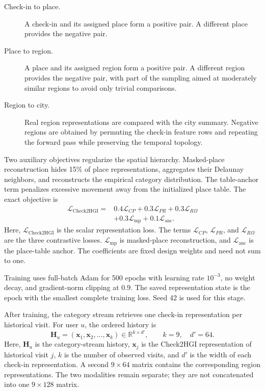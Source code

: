 \begin{description}
    \item[Check-in to place.] A check-in and its assigned place form a positive
    pair. A different place provides the negative pair.

    \item[Place to region.] A place and its assigned region form a positive pair.
    A different region provides the negative pair, with part of the sampling aimed
    at moderately similar regions to avoid only trivial comparisons.

    \item[Region to city.] Real region representations are compared with the city
    summary. Negative regions are obtained by permuting the check-in feature rows
    and repeating the forward pass while preserving the temporal topology.
\end{description}

Two auxiliary objectives regularize the spatial hierarchy. Masked-place
reconstruction hides 15\% of place representations, aggregates their Delaunay
neighbors, and reconstructs the empirical category distribution. The table-anchor
term penalizes excessive movement away from the initialized place table. The exact
objective is
\begin{equation}
\begin{split}
    \mathcal{L}_{\mathrm{Check2HGI}}={}&
    0.4\mathcal{L}_{C\!P}+0.3\mathcal{L}_{P\!R}
    +0.3\mathcal{L}_{R\!\Omega}\\
    &+0.3\mathcal{L}_{\mathrm{mp}}+0.1\mathcal{L}_{\mathrm{anc}}.
\end{split}
\label{eq:apx-check2hgi-loss}
\end{equation}
Here, $\mathcal{L}_{\mathrm{Check2HGI}}$ is the scalar representation loss.
The terms $\mathcal{L}_{C\!P}$, $\mathcal{L}_{P\!R}$, and
$\mathcal{L}_{R\!\Omega}$ are the three contrastive losses.
$\mathcal{L}_{\mathrm{mp}}$ is masked-place reconstruction, and
$\mathcal{L}_{\mathrm{anc}}$ is the place-table anchor. The coefficients are fixed
design weights and need not sum to one.

Training uses full-batch Adam for 500 epochs with learning rate $10^{-3}$, no weight
decay, and gradient-norm clipping at $0.9$. The saved representation state is the
epoch with the smallest complete training loss. Seed 42 is used for this stage.

After training, the category stream retrieves one check-in representation per
historical visit. For user $u$, the ordered history is
\begin{equation}
    \mathbf{H}_u=(\mathbf{x}_1,\mathbf{x}_2,\ldots,\mathbf{x}_k)
    \in\mathbb{R}^{k\times d'},\qquad k=9,\quad d'=64.
    \label{eq:apx-user-sequence}
\end{equation}
Here, $\mathbf{H}_u$ is the category-stream history, $\mathbf{x}_j$ is the
Check2HGI representation of historical visit $j$, $k$ is the number of observed
visits, and $d'$ is the width of each check-in representation. A second
$9\times64$ matrix contains the corresponding region representations. The two
modalities remain separate; they are not concatenated into one $9\times128$
matrix.

